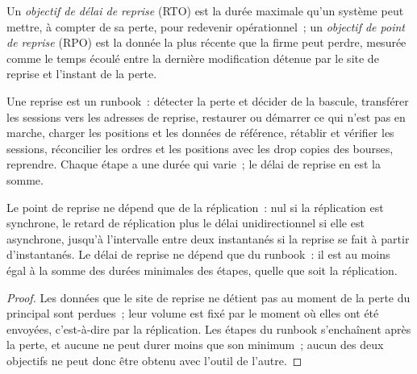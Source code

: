 \begin{definition}\label{def:nw:disaster-recovery-and-regulatory-requirements:objectives}
Un \emph{objectif de délai de reprise} (RTO) est la durée maximale qu'un système peut mettre, à compter de sa perte, pour
redevenir opérationnel~; un \emph{objectif de point de reprise} (RPO) est la donnée la plus récente que la firme peut perdre, mesurée comme
le temps écoulé entre la dernière modification détenue par le site de reprise et l'instant de la perte.
\end{definition}

Une reprise est un runbook~: détecter la perte et décider de la bascule, transférer les sessions vers les adresses de reprise, restaurer ou démarrer ce qui
n'est pas en marche, charger les positions et les données de référence, rétablir et vérifier les sessions, réconcilier les ordres et les positions avec les
drop copies des bourses, reprendre. Chaque étape a une durée qui varie~; le délai de reprise en est la somme.

\label{lst:nw:disaster-recovery-and-regulatory-requirements:rto}

\begin{proposition}\label{prop:nw:disaster-recovery-and-regulatory-requirements:objectives}
Le point de reprise ne dépend que de la réplication~: nul si la réplication est synchrone, le retard de réplication plus le délai
unidirectionnel si elle est asynchrone, jusqu'à l'intervalle entre deux instantanés si la reprise se fait à partir d'instantanés. Le délai
de reprise ne dépend que du runbook~: il est au moins égal à la somme des durées minimales des étapes, quelle que soit la réplication.
\end{proposition}

\begin{proof}
Les données que le site de reprise ne détient pas au moment de la perte du principal sont perdues~; leur volume est fixé par le moment où elles ont été envoyées, c'est-à-dire par la réplication.
Les étapes du runbook s'enchaînent après la perte, et aucune ne peut durer moins que son minimum~; aucun des deux objectifs ne peut donc
être obtenu avec l'outil de l'autre.
\end{proof}

